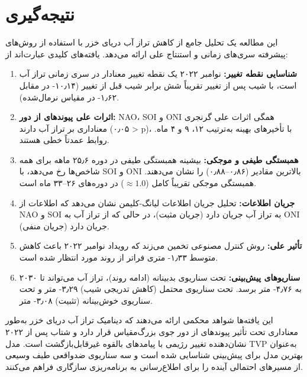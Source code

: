 \documentclass[12pt,a4paper,twocolumn]{article}
\begin{document}
\section{نتیجه‌گیری}

این مطالعه یک تحلیل جامع از کاهش تراز آب دریای خزر با استفاده از روش‌های پیشرفته سری‌های زمانی و استنتاج علی ارائه می‌دهد. یافته‌های کلیدی عبارت‌اند از:

\begin{enumerate}
    \item \textbf{شناسایی نقطه تغییر:} نوامبر ۲۰۲۲ یک نقطه تغییر معنادار در سری زمانی تراز آب است، با شیب پس از تغییر تقریباً شش برابر شیب قبل از تغییر (۱۰٫۱۴- در مقابل ۱٫۶۲- در مقیاس نرمال‌شده).
    
    \item \textbf{اثرات علی پیوندهای از دور:} NAO، SOI و ONI همگی اثرات علی گرنجری معناداری بر تراز آب دارند (۰٫۰۵ > p)، با تأخیرهای بهینه به‌ترتیب ۱۲، ۹ و ۴ ماه. روابط عمدتاً خطی هستند.
    
    \item \textbf{همبستگی طیفی و موجکی:} بیشینه همبستگی طیفی در دوره ۲۵٫۶ ماهه برای همه شاخص‌ها رخ می‌دهد، با SOI و ONI بالاترین مقادیر (۰٫۸۶–۰٫۸۸) را نشان می‌دهند. همبستگی موجکی تقریباً کامل ($\approx 1.0$) در دوره‌های ۲۶–۳۳ ماه است.
    
    \item \textbf{جریان اطلاعات:} تحلیل جریان اطلاعات لیانگ-کلیمن نشان می‌دهد که اطلاعات از NAO و SOI به تراز آب جریان دارد (جریان مثبت)، در حالی که از تراز آب به ONI جریان دارد (جریان منفی).
    
    \item \textbf{تأثیر علی:} روش کنترل مصنوعی تخمین می‌زند که رویداد نوامبر ۲۰۲۲ باعث کاهش متوسط ۱٫۳۳- متری فراتر از روند مورد انتظار شده است.
    
    \item \textbf{سناریوهای پیش‌بینی:} تحت سناریوی بدبینانه (ادامه روند)، تراز آب می‌تواند تا ۲۰۳۰ به ۴٫۷۶- متر برسد. تحت سناریوی محتمل (کاهش تدریجی شیب) ۳٫۲۹- متر و تحت سناریوی خوش‌بینانه (تثبیت) ۳٫۰۸- متر.
\end{enumerate}

این یافته‌ها شواهد محکمی ارائه می‌دهند که دینامیک تراز آب دریای خزر به‌طور معناداری تحت تأثیر پیوندهای از دور جوی بزرگ‌مقیاس قرار دارد و شتاب پس از ۲۰۲۲ نشان‌دهنده تغییر رژیمی با پیامدهای بالقوه غیرقابل‌بازگشت است. مدل TVP به‌عنوان بهترین مدل برای پیش‌بینی شناسایی شده است و سه سناریوی ضدواقعی طیف وسیعی از مسیرهای احتمالی آینده را برای اطلاع‌رسانی به برنامه‌ریزی سازگاری فراهم می‌کنند.
\end{document}

